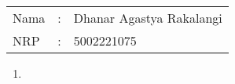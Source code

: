 \documentclass[a4paper, 12pt]{article}
\begin{document}
    \begin{tabular}{|lcl|}
     \hline
     Nama&:&Dhanar Agastya Rakalangi\\
     NRP&:&5002221075\\
     \hline
    \end{tabular}

    \begin{enumerate}
        \item 
    \end{enumerate} 
    
\end{document}
